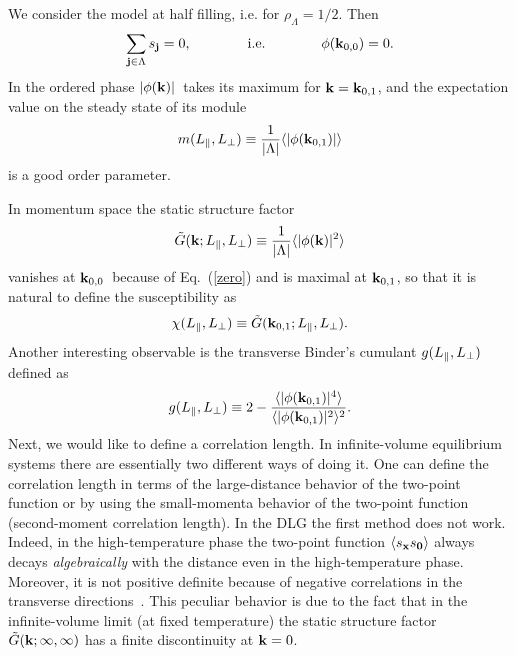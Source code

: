 \documentclass[12pt]{article}
\begin{document}
We consider the model at half filling, i.e. for $\rho_\Lambda = 1/2$. Then
\begin{equation}
        \sum_{{\bf j}\in\Lambda} s_{{\bf j}} = 0, \qquad\qquad 
        {\rm i.e.} \qquad\qquad
        \phi({\bf k}_{0,0})=0. \label{zero}
\end{equation}
In the ordered phase $|\phi({\bf k})|$\ takes its maximum for \mbox{${\bf k} =
{\bf k}_{0,1}$}, and the expectation value on the steady state of its module
\begin{equation}
        m(L_{\|},L_{\bot}) \equiv {1\over |\Lambda|}
            \langle|\phi({\bf k}_{0,1})| \rangle
\label{magnetization}
\end{equation}
is a good order parameter.

In momentum space the static structure factor
\begin{equation}
        \tilde{G}({\bf k}; L_{\|},L_{\bot})\equiv 
        {1\over |\Lambda|} \langle|\phi({\bf k})|^{2}\rangle
\label{statstrfa}
\end{equation}
vanishes at ${\bf k}_{0,0}$\ because of Eq.~(\ref{zero}) and is maximal at
${\bf k}_{0,1}$, so that it is natural to define the susceptibility
as \cite{foot5}
\begin{equation}
        \chi (L_{\|},L_{\bot}) \equiv \tilde{G}({\bf k}_{0,1}; L_{\|},L_{\bot}).
\label{defChi}
\end{equation}
Another interesting observable is the transverse Binder's 
cumulant $g(L_{\|}, L_{\bot})$
defined as
\begin{equation}
\label{defbinder}
g(L_{\|}, L_{\bot})  \equiv  2- 
\frac{\langle|\phi({\bf k}_{0,1})|^{4}\rangle}
{\langle|\phi({\bf k}_{0,1})|^{2}\rangle^2}.
\end{equation}
Next, we would like to define a correlation length. In infinite-volume 
equilibrium systems there are essentially two different ways 
of doing it. One can define the correlation length in terms of the 
large-distance behavior of the two-point function or by using the 
small-momenta behavior of the two-point function (second-moment correlation
length). In the DLG the first method does not work. 
Indeed, in the high-temperature phase the two-point function 
  $\langle s_{{\bf x}}s_{{\bf 0}}\rangle$
always decays {\it algebraically} with the distance even in the
high-temperature phase. 
Moreover, it is not positive definite because of
negative correlations in the transverse directions~\cite{Schmittmann95}. 
This peculiar behavior is due to the fact
that in the infinite-volume limit (at fixed temperature)
the static structure factor 
$\tilde{G}({\bf k};\infty,\infty)$ has a finite discontinuity at ${\bf k}=0$. 
\end{document}
